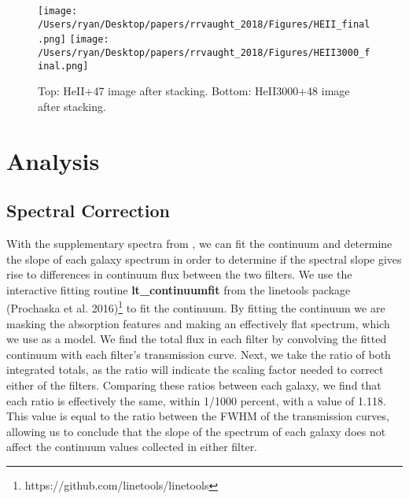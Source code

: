 \documentclass[twocolumn]{aastex6}
\begin{document}
\begin{figure*}[ht!]
\centering
\texttt{[image: /Users/ryan/Desktop/papers/rrvaught\_2018/Figures/HEII\_final.png]}
\texttt{[image: /Users/ryan/Desktop/papers/rrvaught\_2018/Figures/HEII3000\_final.png]}
\caption{Top: HeII+47 image after stacking. Bottom: HeII3000+48 image after stacking. }
\label{fig:stacked_image}
\end{figure*}
\section{Analysis}

\subsection{Spectral Correction}
With the supplementary spectra from \cite{Rubin_2014}, we can fit the continuum and determine the slope of each galaxy spectrum in order to determine if the spectral slope gives rise to differences in continuum flux between the two filters. We use the interactive fitting routine \textbf{lt\_continuumfit} from the linetools package (Prochaska et al. 2016)\footnote{https://github.com/linetools/linetools} to fit the continuum. By fitting the continuum we are masking the absorption features and making an effectively flat spectrum, which we use as a model. We find the total flux in each filter by convolving the fitted continuum with each filter's transmission curve. Next, we take the ratio of both integrated totals, as the ratio will indicate the scaling factor needed to correct either of the filters. Comparing these ratios between each galaxy, we find that each ratio is effectively the same, within 1/1000 percent, with a value of 1.118. This value is equal to the ratio between the FWHM of the transmission curves, allowing us to conclude that the slope of the spectrum of each galaxy does not affect the continuum values collected in either filter.
\end{document}
